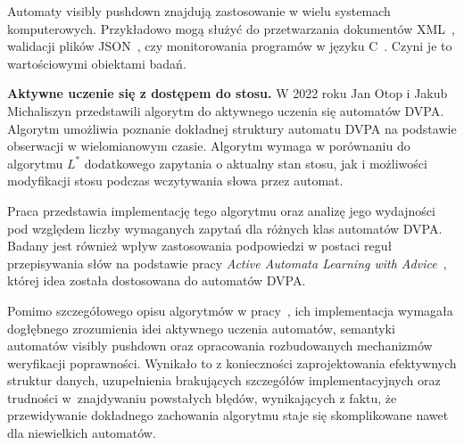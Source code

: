 Automaty visibly pushdown znajdują zastosowanie w wielu systemach komputerowych. Przykładowo mogą służyć do przetwarzania dokumentów XML~\cite{xml},
walidacji plików JSON~\cite{json}, czy monitorowania programów w języku C~\cite{Cmonitor}. Czyni je to wartościowymi obiektami badań.

\textbf{Aktywne uczenie się z dostępem do stosu.} W 2022 roku Jan Otop i Jakub Michaliszyn przedstawili algorytm do aktywnego uczenia się automatów DVPA.
Algorytm umożliwia poznanie dokładnej struktury automatu DVPA na podstawie obserwacji w wielomianowym czasie. Algorytm wymaga w porównaniu
do algorytmu $L^*$ dodatkowego zapytania o aktualny stan stosu, jak i możliwości modyfikacji stosu podczas wczytywania słowa przez automat.

Praca przedstawia implementację tego algorytmu oraz analizę jego wydajności pod względem liczby wymaganych zapytań dla różnych klas automatów DVPA.
Badany jest również wpływ zastosowania podpowiedzi w postaci reguł przepisywania słów na podstawie pracy \textit{Active Automata Learning with Advice}~\cite{srs},
której idea została dostosowana do automatów DVPA.

Pomimo szczegółowego opisu algorytmów w pracy~\cite{main}, ich implementacja wymagała dogłębnego zrozumienia idei
aktywnego uczenia automatów, semantyki automatów visibly pushdown oraz opracowania rozbudowanych mechanizmów
weryfikacji poprawności. Wynikało to z konieczności zaprojektowania efektywnych struktur danych,
uzupełnienia brakujących szczegółów implementacyjnych oraz trudności w~znajdywaniu powstałych błędów, wynikających z faktu,
że przewidywanie dokładnego zachowania algorytmu staje się skomplikowane nawet dla niewielkich automatów.